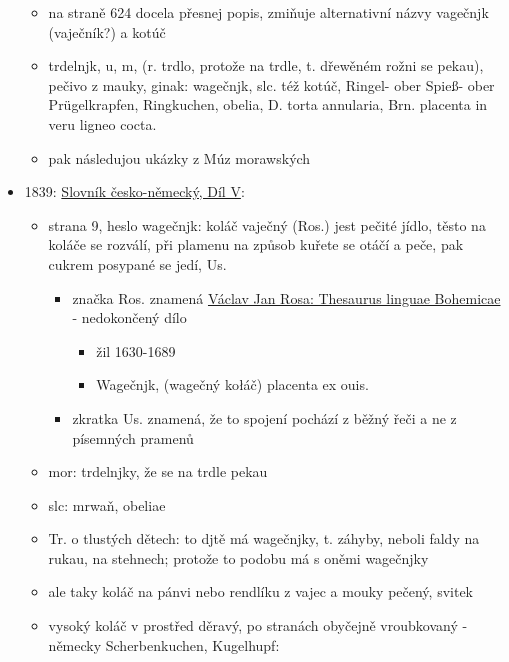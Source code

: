 \begin{itemize}
  \begin{itemize}
  \tightlist
  \item
    na straně 624 docela přesnej popis, zmiňuje alternativní názvy
    vagečnjk (vaječník?) a kotúč
  \item
    trdelnjk, u, m, (r. trdlo, protože na trdle, t. dřewěném rožni se
    pekau), pečivo z mauky, ginak: wagečnjk, slc. též kotúč, Ringel-
    ober Spieß- ober Prügelkrapfen, Ringkuchen, obelia, D. torta
    annularia, Brn. placenta in veru ligneo cocta.
  \item
    pak následujou ukázky z Múz morawských
  \end{itemize}
\item
  1839:
  \href{https://vokabular.ujc.cas.cz/moduly/slovniky/digitalni-kopie-detail/JgSlov05/strana-9}{Slovník
  česko-německý, Díl V}:

  \begin{itemize}
  \tightlist
  \item
    strana 9, heslo wagečnjk: koláč vaječný (Ros.) jest pečité jídlo,
    těsto na koláče se rozválí, při plamenu na způsob kuřete se otáčí a
    peče, pak cukrem posypané se jedí, Us.

    \begin{itemize}
    \tightlist
    \item
      značka Ros. znamená
      \href{https://bara.ujc.cas.cz/slovniky/rosa/rosafst1480.html}{Václav
      Jan Rosa: Thesaurus linguae Bohemicae} - nedokončený dílo

      \begin{itemize}
      \tightlist
      \item
        žil 1630-1689
      \item
        Wagečnjk, (wagečný kołáč) placenta ex ouis.
      \end{itemize}
    \item
      zkratka Us. znamená, že to spojení pochází z běžný řeči a ne z
      písemných pramenů
    \end{itemize}
  \item
    mor: trdelnjky, že se na trdle pekau
  \item
    slc: mrwaň, obeliae
  \item
    Tr. o tlustých dětech: to djtě má wagečnjky, t. záhyby, neboli faldy
    na rukau, na stehnech; protože to podobu má s oněmi wagečnjky
  \item
    ale taky koláč na pánvi nebo rendlíku z vajec a mouky pečený, svitek
  \item
    vysoký koláč v prostřed děravý, po stranách obyčejně vroubkovaný -
    německy Scherbenkuchen, Kugelhupf:


\end{itemize}
\end{itemize}

